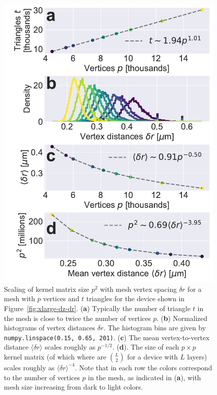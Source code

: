 \documentclass[final,3p,times,twocolumn]{elsarticle}
\newcommand{\inline}[1]{\texttt{#1}\xspace}
\begin{document}
\begin{figure}[t]
    \centering
    \includegraphics[width=\linewidth]{examples/images/scaling.pdf}
    \caption{Scaling of kernel matrix size $p^2$ with mesh vertex spacing $\delta r$ for a mesh with $p$ vertices and $t$ triangles for the device shown in Figure~\ref{fig:xlarge-dz-dr}. ({\bf a}) Typically the number of triangle $t$ in the mesh is close to twice the number of vertices $p$. ({\bf b}) Normalized histograms of vertex distances $\delta r$. The histogram bins are given by \inline{numpy.linspace(0.15, 0.65, 201)}. ({\bf c}) The mean vertex-to-vertex distance $\langle\delta r\rangle$ scales roughly as $p^{-1/2}$. ({\bf d}). The size of each $p\times p$ kernel matrix (of which where are $\binom{L}{2}$ for a device with $L$ layers) scales roughly as $\langle\delta r\rangle^{-4}$. Note that in each row the colors correspond to the number of vertices $p$ in the mesh, as indicated in ({\bf a}), with mesh size increasing from dark to light colors.}
    \label{fig:scaling}
\end{figure}
\end{document}
